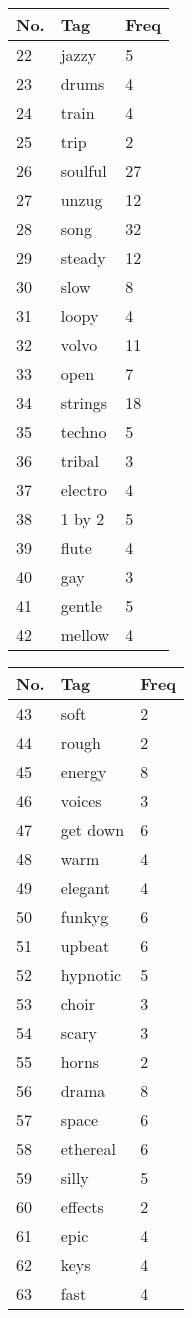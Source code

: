 \begin{appendices}
\quad
\begin{tabular}{| p{} | p{} | p{}|}
\hline
\textbf{No.} & \textbf{Tag} & \textbf{Freq}\\
\hline
22 & jazzy & 5\\
\hline
23 & drums & 4\\
\hline
24 & train & 4\\
\hline
25 & trip & 2\\
\hline
26 & soulful & 27\\
\hline
27 & unzug & 12\\
\hline
28 & song & 32\\
\hline
29 & steady & 12\\
\hline
30 & slow & 8\\
\hline
31 & loopy & 4\\
\hline
32 & volvo & 11\\
\hline
33 & open & 7\\
\hline
34 & strings & 18\\
\hline
35 & techno & 5\\
\hline
36 & tribal & 3\\
\hline
37 & electro & 4\\
\hline
38 & 1 by 2 & 5\\
\hline
39 & flute & 4\\
\hline
40 & gay & 3\\
\hline
41 & gentle & 5\\
\hline
42 & mellow & 4\\
\hline
\end{tabular}
\quad
\begin{tabular}{| p{} | p{} | p{}|}
\hline
\textbf{No.} & \textbf{Tag} & \textbf{Freq}\\
\hline
43 & soft & 2\\
\hline
44 & rough & 2\\
\hline
45 & energy & 8\\
\hline
46 & voices & 3\\
\hline
47 & get down & 6\\
\hline
48 & warm & 4\\
\hline
49 & elegant & 4\\
\hline
50 & funkyg & 6\\
\hline
51 & upbeat & 6\\
\hline
52 & hypnotic & 5\\
\hline 
53 & choir & 3\\
\hline
54 & scary & 3\\
\hline 
55 & horns & 2\\
\hline
56 & drama & 8\\
\hline
57 & space & 6\\
\hline
58 & ethereal & 6\\
\hline
59 & silly & 5\\
\hline
60 & effects & 2\\
\hline
61 & epic & 4\\
\hline
62 & keys & 4\\
\hline
63 & fast & 4\\
\hline
\end{tabular}
\clearpage


\end{appendices}
